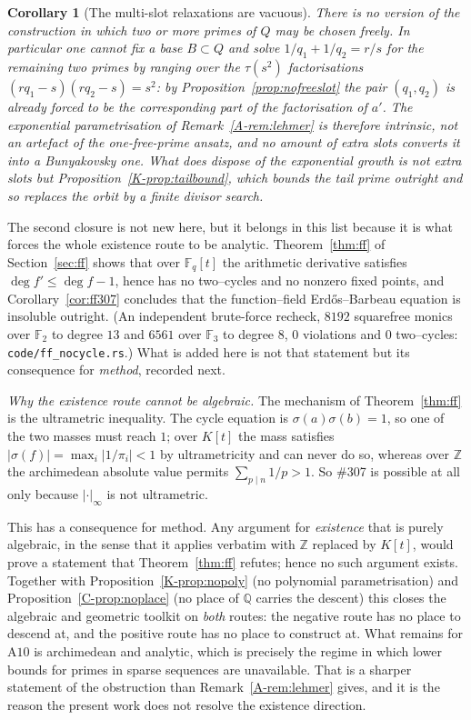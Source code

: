 \documentclass[11pt]{article}
\newtheorem{corollary}[theorem]{Corollary}
\theoremstyle{definition}
\begin{document}
\begin{corollary}[The multi-slot relaxations are vacuous]\label{cor:noslack}
There is no version of the construction in which two or more primes of $Q$ may be chosen freely.
In particular one cannot fix a base $B\subset Q$ and solve $1/q_1+1/q_2=r/s$ for the remaining two
primes by ranging over the $\tau(s^2)$ factorisations $(rq_1-s)(rq_2-s)=s^2$: by
Proposition~\ref{prop:nofreeslot} the pair $(q_1,q_2)$ is already forced to be the corresponding
part of the factorisation of $a'$. The exponential parametrisation of
Remark~\textup{\ref{A-rem:lehmer}} is therefore intrinsic, not an artefact of the one-free-prime
ansatz, and no amount of extra slots converts it into a Bunyakovsky one. What does dispose of the
exponential growth is not extra slots but Proposition~\ref{K-prop:tailbound}, which bounds the tail
prime outright and so replaces the orbit by a finite divisor search.
\end{corollary}

The second closure is not new here, but it belongs in this list because it is what forces the whole
existence route to be analytic. Theorem~\ref{thm:ff} of Section~\ref{sec:ff} shows that over
$\mathbb{F}_q[t]$ the arithmetic derivative satisfies $\deg f'\le\deg f-1$, hence has no two--cycles
and no nonzero fixed points, and Corollary~\ref{cor:ff307} concludes that the function--field
Erd\H{o}s--Barbeau equation is insoluble outright. \textup{(An independent brute-force recheck,
$8192$ squarefree monics over $\mathbb{F}_2$ to degree $13$ and $6561$ over $\mathbb{F}_3$ to
degree $8$, $0$ violations and $0$ two--cycles: \texttt{code/ff\_nocycle.rs}.)} What is added here
is not that statement but its consequence for \emph{method}, recorded next.

\emph{Why the existence route cannot be algebraic.} The mechanism of Theorem~\ref{thm:ff} is the ultrametric inequality. The cycle equation is
$\sigma(a)\sigma(b)=1$, so one of the two masses must reach $1$; over $K[t]$ the mass satisfies
$|\sigma(f)|=\max_i|1/\pi_i|<1$ by ultrametricity and can never do so, whereas over $\mathbb{Z}$ the
archimedean absolute value permits $\sum_{p\mid n}1/p>1$. So \#307 is possible at all only because
$|\cdot|_\infty$ is not ultrametric.

This has a consequence for method. Any argument for \emph{existence} that is purely algebraic, in
the sense that it applies verbatim with $\mathbb{Z}$ replaced by $K[t]$, would prove a statement
that Theorem~\ref{thm:ff} refutes; hence no such argument exists. Together with
Proposition~\ref{K-prop:nopoly} (no polynomial parametrisation) and Proposition~\ref{C-prop:noplace}
(no place of $\mathbb{Q}$ carries the descent) this closes the algebraic and geometric toolkit on
\emph{both} routes: the negative route has no place to descend at, and the positive route has no
place to construct at. What remains for $\mathrm{A}10$ is archimedean and analytic, which is
precisely the regime in which lower bounds for primes in sparse sequences are unavailable. That is
a sharper statement of the obstruction than Remark~\ref{A-rem:lehmer} gives, and it is the reason the
present work does not resolve the existence direction.
\end{document}
